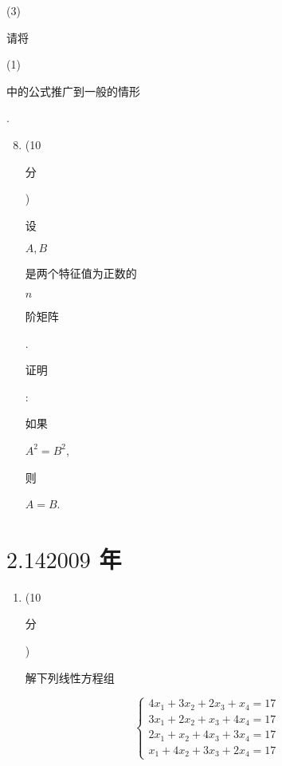 \documentclass[10pt]{article}
\begin{document}
(3) \begin{CJK}{UTF8}{mj}请将\end{CJK} (1) \begin{CJK}{UTF8}{mj}中的公式推广到一般的情形\end{CJK}.

\begin{enumerate}
  \setcounter{enumi}{7}
  \item (10 \begin{CJK}{UTF8}{mj}分\end{CJK}) \begin{CJK}{UTF8}{mj}设\end{CJK} $A, B$ \begin{CJK}{UTF8}{mj}是两个特征值为正数的\end{CJK} $n$ \begin{CJK}{UTF8}{mj}阶矩阵\end{CJK}. \begin{CJK}{UTF8}{mj}证明\end{CJK}: \begin{CJK}{UTF8}{mj}如果\end{CJK} $A^{2}=B^{2}$, \begin{CJK}{UTF8}{mj}则\end{CJK} $A=B$.
\end{enumerate}
\section{$2.142009$ 年}
\begin{enumerate}
  \item (10 \begin{CJK}{UTF8}{mj}分\end{CJK}) \begin{CJK}{UTF8}{mj}解下列线性方程组\end{CJK}
\end{enumerate}
$$
\left\{\begin{array}{l}
4 x_{1}+3 x_{2}+2 x_{3}+x_{4}=17 \\
3 x_{1}+2 x_{2}+x_{3}+4 x_{4}=17 \\
2 x_{1}+x_{2}+4 x_{3}+3 x_{4}=17 \\
x_{1}+4 x_{2}+3 x_{3}+2 x_{4}=17
\end{array}\right.
$$
\end{document}
